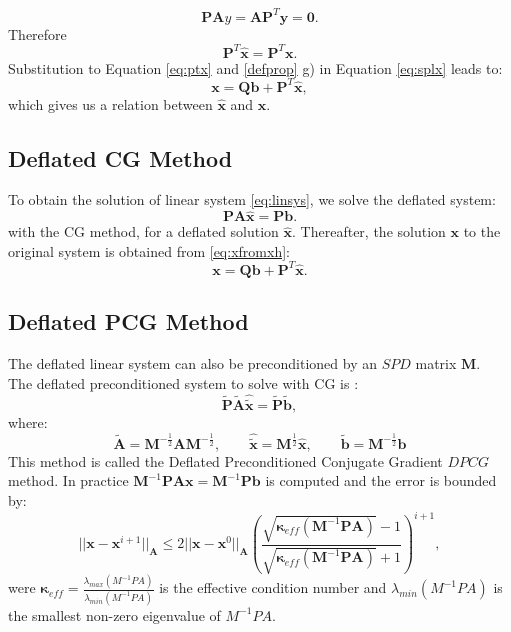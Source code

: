 \documentclass[12pt]{article}
\numberwithin{equation}{section}
\begin{document}
 \begin{equation*}
 \mathbf{P}\mathbf{A}y=\mathbf{A}\mathbf{P}^T\mathbf{y}=\mathbf{0}.
 \end{equation*}
 Therefore
  \begin{equation}\label{eq:ptx}
\mathbf{P}^T\mathbf{\hat{x}}=\mathbf{P}^T\mathbf{x}.
 \end{equation}
Substitution to Equation \eqref{eq:ptx} and \ref{defprop} g) in Equation \eqref{eq:splx} leads to:
\begin{equation}\label{eq:xfromxh}
    \mathbf{x}=\mathbf{Q}\mathbf{b}+\mathbf{P}^T\mathbf{\hat{x}}, 
\end{equation}
which gives us a relation between $\mathbf{\hat{x}}$ and $\mathbf{x}$.
 
\subsection{Deflated CG Method}
\hspace{0.5cm}To obtain the solution of linear system \eqref{eq:linsys}, we solve the deflated system:
\begin{equation}\label{eq:deflsys}
    \mathbf{P}\mathbf{A}\hat{\mathbf{x}}=\mathbf{P}\mathbf{b}.
\end{equation}
with the CG method, for a deflated solution $\hat{\mathbf{x}}$. 
Thereafter, the solution $\mathbf{x}$ to the original system is obtained from \eqref{eq:xfromxh}:
$$\mathbf{x}=\mathbf{Q}\mathbf{b}+\mathbf{P}^T\hat{\mathbf{x}}.$$
\subsection*{Deflated PCG Method}
The deflated linear system can also be preconditioned by an $SPD$ matrix $\mathbf{M}$.\\
The deflated preconditioned system to solve with CG is \cite{Tang09}:
$$\tilde{\mathbf{P}} \tilde{\mathbf{A}} \hat{\tilde{\mathbf{x}}}=\tilde{\mathbf{P}}\tilde{\mathbf{b}},$$
where:
\begin{equation*}
 \tilde{\mathbf{A}}=\mathbf{M}^{-\frac{1}{2}}\mathbf{A}\mathbf{M}^{-\frac{1}{2}}, \qquad \hat{\tilde{\mathbf{x}}}=\mathbf{M}^{\frac{1}{2}}\hat{\mathbf{x}}, \qquad
 \tilde{\mathbf{b}}=\mathbf{M}^{-\frac{1}{2}}\mathbf{b}
\end{equation*}
This method is called the Deflated Preconditioned Conjugate Gradient $DPCG$ method.
In practice $\mathbf{M}^{-1}\mathbf{P}\mathbf{A}\mathbf{x}=\mathbf{M}^{-1}\mathbf{P}\mathbf{b}$ is computed and the error is bounded by:
\begin{equation*}
 ||\mathbf{x}-\mathbf{x}^{i+1}||_\mathbf{A}\leq 2||\mathbf{x}-\mathbf{x}^{0}||_\mathbf{A} \left( \frac{\sqrt{\mathbf{\kappa}_{eff}(\mathbf{M}^{-1}\mathbf{P}\mathbf{A})}-1}{\sqrt{\mathbf{\kappa}_{eff}(\mathbf{M}^{-1}\mathbf{P}\mathbf{A})}+1} \right)^{i+1},
\end{equation*}
were $\mathbf{\kappa}_{eff}=\frac{\lambda_{max}(M^{-1}PA)}{\lambda_{min}(M^{-1}PA)}$ is the effective condition 
number and $\lambda_{min}(M^{-1}PA)$ is the smallest non-zero eigenvalue of $M^{-1}PA$.
\end{document}
